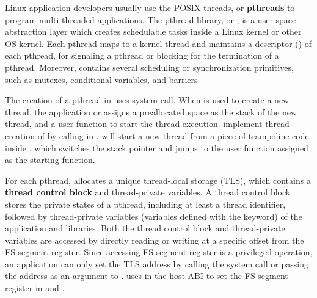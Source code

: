 \label{sec:libos:thread}


Linux application developers usually use
the POSIX threads, or {\bf pthreads} to program multi-threaded applications.
The pthread library, or \libpthread{},
is a user-space abstraction layer
which creates schedulable tasks inside a Linux kernel or other OS kernel.
Each pthread maps to a kernel thread
and \libpthread{} maintains a descriptor () of each pthread,
for signaling a pthread or blocking for the termination of a pthread.
Moreover,
\libpthread{}contains several scheduling or synchronization primitives, such as mutexes, conditional variables, and barriers.


The creation of a pthread in \libpthread{} uses  system call.
When  is used to create a new thread,
the application or \libpthread{} assigns a preallocated space as the stack of the new thread, and a user function to start the thread execution.
\thelibos{} implement thread creation of  by calling  in \thehostabi{}.
 will start a new thread from a piece of trampoline code inside \thelibos{}, which switches the stack pointer and jumps to the user function assigned as the starting function.









For each pthread, \libpthread{} allocates a unique thread-local storage (TLS), which contains a {\bf thread control block} and thread-private variables.
A thread control block stores the private states of a pthread, including at least a thread identifier, followed by thread-private variables (variables defined with the  keyword) of the application
and libraries.
Both the thread control block and thread-private variables
are accessed by directly reading or writing at a specific offset from the FS segment register.
Since accessing FS segment register is a privileged operation,
an application can only set the TLS address
by calling the  system call or passing the address as an argument to .
\thelibos{} uses  in the host ABI
to set the FS segment register
in  and .


